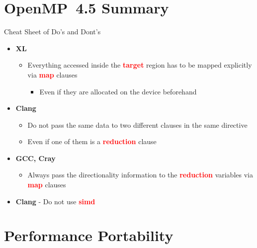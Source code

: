 \documentclass[xcolor=dvipsnames,compress,10pt]{nersc}
\begin{document}
\section{OpenMP~4.5 Summary}
\begin{frame}[fragile]{Cheat Sheet of Do's and Dont's }
\begin{itemize}
    \setlength\itemsep{1.2em}
    \item \textbf{XL}
    \begin{itemize}
        \item Everything accessed inside the \textcolor{red}{\textbf{target}} region  has to be mapped explicitly via \textcolor{red}{\textbf{map}} clauses
        \begin{itemize}
            \item Even if they are allocated on the device beforehand
        \end{itemize}
        \end{itemize}
    \item \textbf{Clang}
    \begin{itemize}
        \item Do not pass the same data to two different clauses in the same directive
        \item Even if one of them is a \textcolor{red}{\textbf{reduction}} clause
    \end{itemize}
    \item \textbf{GCC, Cray}
    \begin{itemize}
        \item Always pass the directionality information to the \textcolor{red}{\textbf{reduction}} variables via \textcolor{red}{\textbf{map}} clauses
    \end{itemize}
    \item \textbf{Clang} - Do not use \textcolor{red}{\textbf{simd}}
\end{itemize}
\end{frame}


\section{Performance Portability}
\end{document}

